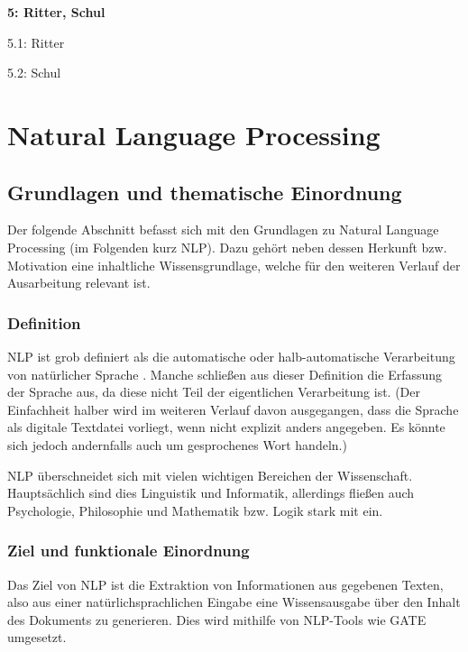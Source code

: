 \documentclass[12pt]{report}
\begin{document}
\begin{multicols}{2}
\begin{compactitem}
\item[] \textbf{5: Ritter, Schul}
\begin{compactitem}
\item[] 5.1: Ritter
\item[] 5.2: Schul
\end{compactitem}
\end{compactitem}
\end{multicols}

\chapter{Natural Language Processing}
\section{Grundlagen und thematische Einordnung}
Der folgende Abschnitt befasst sich mit den Grundlagen zu Natural Language Processing (im Folgenden kurz NLP). Dazu gehört neben dessen Herkunft bzw. Motivation eine inhaltliche Wissensgrundlage, welche für den weiteren Verlauf der Ausarbeitung relevant ist. 

\subsection{Definition}
NLP ist grob definiert als die automatische oder halb-automatische Verarbeitung von natürlicher Sprache \cite{cop04}. Manche schließen aus dieser Definition die Erfassung der Sprache aus, da diese nicht Teil der eigentlichen Verarbeitung ist. (Der Einfachheit halber wird im weiteren Verlauf davon ausgegangen, dass die Sprache als digitale Textdatei vorliegt, wenn nicht explizit anders angegeben. Es könnte sich jedoch andernfalls auch um gesprochenes Wort handeln.)

NLP überschneidet sich mit vielen wichtigen Bereichen der Wissenschaft. Hauptsächlich sind dies Linguistik und Informatik, allerdings fließen auch Psychologie, Philosophie und Mathematik bzw. Logik stark mit ein. 

\subsection{Ziel und funktionale Einordnung}
Das Ziel von NLP ist die Extraktion von Informationen aus gegebenen Texten, also aus einer natürlichsprachlichen Eingabe eine Wissensausgabe über den Inhalt des Dokuments zu generieren. Dies wird mithilfe von NLP-Tools wie GATE umgesetzt.
\end{document}
